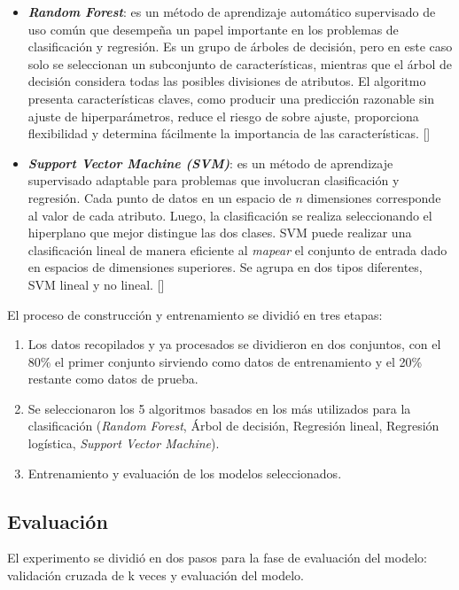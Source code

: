\begin{itemize}
    \item \textit{\textbf{Random Forest}}: es un método de aprendizaje automático supervisado de uso común que desempeña un papel importante en los problemas de clasificación y regresión. Es un grupo de árboles de decisión, pero en este caso solo se seleccionan un subconjunto de características, mientras que el árbol de decisión considera todas las posibles divisiones de atributos. El algoritmo presenta características claves, como producir una predicción razonable sin ajuste de hiperparámetros, reduce el riesgo de sobre ajuste, proporciona flexibilidad y determina fácilmente la importancia de las características. [\cite{faul2019concise}]
    \item \textit{\textbf{Support Vector Machine (SVM)}}: es un método de aprendizaje supervisado adaptable para problemas que involucran clasificación y regresión. Cada punto de datos en un espacio de $n$ dimensiones corresponde al valor de cada atributo. Luego, la clasificación se realiza seleccionando el hiperplano que mejor distingue las dos clases. SVM puede realizar una clasificación lineal de manera eficiente al \textit{mapear} el conjunto de entrada dado en espacios de dimensiones superiores. Se agrupa en dos tipos diferentes, SVM lineal y no lineal. [\cite{wei-meng2019python}]
\end{itemize}

El proceso de construcción y entrenamiento se dividió en tres etapas:
\begin{enumerate}
    \item Los datos recopilados y ya procesados se dividieron en dos conjuntos, con el 80\% el primer conjunto sirviendo como datos de entrenamiento y el 20\% restante como datos de prueba.
    \item Se seleccionaron los 5 algoritmos basados en los más utilizados para la clasificación (\textit{Random Forest}, Árbol de decisión, Regresión lineal, Regresión logística, \textit{Support Vector Machine}).
    \item Entrenamiento y evaluación de los modelos seleccionados.
\end{enumerate}

\subsection{Evaluación}

El experimento se dividió en dos pasos para la fase de evaluación del modelo: validación cruzada de k veces y evaluación del modelo.  

